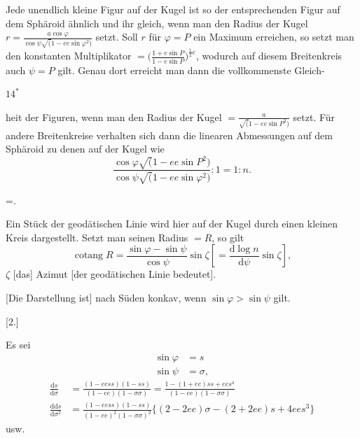 \noindent Jede unendlich kleine Figur auf der Kugel ist so der entsprechenden
Figur auf dem Sphäroid ähnlich und ihr gleich, wenn man den Radius der Kugel
\(r=\frac{a\cos\varphi}{\cos\psi\surd(1-ee\sin\varphi^2)}\) setzt. Soll \(r\) für \(\varphi=P\)
ein Maximum erreichen, so setzt man den konstanten Multiplikator
\(=\bigl(\frac{1+e\sin P}{1-e\sin P}\bigr)^{\frac12 e}\), wodurch auf diesem Breitenkreis
auch \(\psi=P\) gilt. Genau dort erreicht man dann die vollkommenste Gleich-
\par\smallskip
\noindent\hfill \(14^{*}\)\hspace{.12\textwidth}\par

\par\clearpage
\noindent{}\makebox[12mm][r]{}\par\medskip

\noindent heit der Figuren, wenn man den Radius der Kugel
\(=\frac a{\surd(1-ee\sin P^2)}\) setzt. Für andere Breitenkreise verhalten sich dann die linearen Abmessungen
auf dem Sphäroid zu denen auf der Kugel wie
\[
\frac{\cos\varphi\surd(1-ee\sin P^2)}{\cos\psi\surd(1-ee\sin\varphi^2)}:1=1:n.
\]

=\frac{\sin\varphi-\sin\psi}{\cos\psi}.
\]

\noindent Ein Stück der geodätischen Linie wird hier auf der Kugel durch einen
kleinen Kreis dargestellt. Setzt man seinen Radius \(=R\), so gilt
\[
\operatorname{cotang} R=\frac{\sin\varphi-\sin\psi}{\cos\psi}\sin\zeta
\left[=\frac{\mathrm d\log n}{\mathrm d\psi}\sin\zeta\right],
\]
\noindent [wobei] \(\zeta\) [das] Azimut [der geodätischen Linie bedeutet].

[Die Darstellung ist] nach Süden konkav, wenn \(\sin\varphi>\sin\psi\) gilt.

\bigskip
\begin{center}[2.]\end{center}
Es sei
\[
\begin{aligned}
\sin\varphi&=s\\
\sin\psi&=\sigma,
\end{aligned}
\]
\noindent [also]
\[
\begin{aligned}
\frac{\mathrm ds}{\mathrm d\sigma}
&=\frac{(1-eess)(1-ss)}{(1-ee)(1-\sigma\sigma)}
=\frac{1-(1+ee)ss+ees^4}{(1-ee)(1-\sigma\sigma)}\\
\frac{\mathrm{dd}s}{\mathrm d\sigma^2}
&=\frac{(1-eess)(1-ss)}{(1-ee)^2(1-\sigma\sigma)^2}
\{(2-2ee)\sigma-(2+2ee)s+4ees^3\}
\end{aligned}
\]
\noindent\hfill usw.\hfill\null\par

